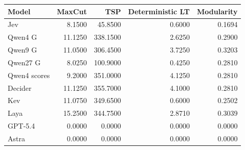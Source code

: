 \begin{tabular}{lrrrr}
\toprule
Model & MaxCut & TSP & Deterministic LT & Modularity \\
\midrule
Jev & 8.1500 & 45.8500 & 0.6000 & 0.1694 \\
Qwen4 G & 11.1250 & 338.1500 & 2.6250 & 0.2900 \\
Qwen9 G & 11.0500 & 306.4500 & 3.7250 & 0.3203 \\
Qwen27 G & 8.0250 & 100.9000 & 0.4250 & 0.2810 \\
Qwen4 scores & 9.2000 & 351.0000 & 4.1250 & 0.2810 \\
Decider & 11.1250 & 355.7000 & 4.1000 & 0.2810 \\
Kev & 11.0750 & 349.6500 & 0.6000 & 0.2502 \\
Laya & 15.2500 & 344.7500 & 2.8710 & 0.3039 \\
\midrule
GPT-5.4 & 0.0000 & 0.0000 & 0.0000 & 0.0000 \\
Astra & 0.0000 & 0.0000 & 0.0000 & 0.0000 \\
\bottomrule
\end{tabular}
